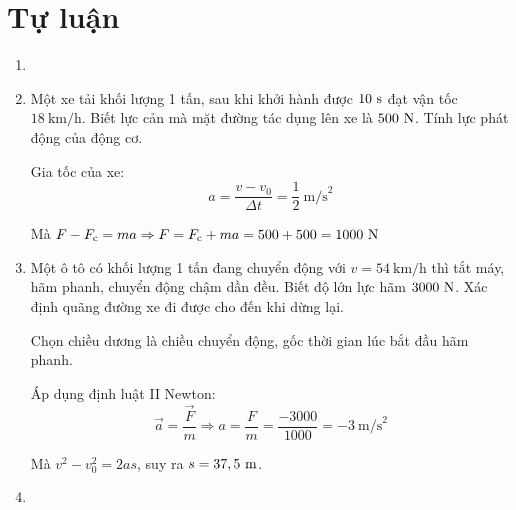 \section{Tự luận}
\begin{enumerate}[label=\bfseries Câu \arabic*:]
	\item {}
	
	
	
\item {}

\cauhoi
{Một xe tải khối lượng 1 tấn, sau khi khởi hành được $10\ \text s$ đạt vận tốc $18\ \text{km/h}$. Biết lực cản mà mặt đường tác dụng lên xe là $500\ \text N$. Tính lực phát động của động cơ.
}

\loigiai
{	Gia tốc của xe:
	\[a = \dfrac{v-v_0}{\Delta t} = \dfrac{1}{2}\ \text{m/s}^2\]
	
	Mà $F-F_\text c = ma \Rightarrow F = F_\text c + ma = 500 + 500 = 1000\ \text N$
}
\item {}

\cauhoi
{Một ô tô có khối lượng 1 tấn đang chuyển động với $v=54\ \text{km/h}$ thì tắt máy, hãm phanh, chuyển động chậm dần đều. Biết độ lớn lực hãm $3000\ \text N$. Xác định quãng đường xe đi được cho đến khi dừng lại.
}

\loigiai
{Chọn chiều dương là chiều chuyển động, gốc thời gian lúc bắt đầu hãm phanh.
	
	Áp dụng định luật II Newton:
	\[ \vec a = \dfrac {\vec F}{m} \Rightarrow a=\dfrac{F}{m} = \dfrac{-3000}{1000} = -3\ \text{m/s}^2\]
	
	Mà $v^2 - v_0 ^2 = 2as$, suy ra $s=37,5\ \text m$.
}
\item {}


\end{enumerate}
